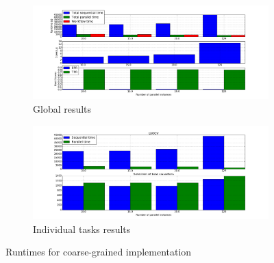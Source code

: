 \documentclass[10pt, conference, compsocconf]{IEEEtran}
\begin{document}
\begin{figure}[h]
  \begin{center}
    \begin{subfigure}{0.5\textwidth}
      \centering
      \includegraphics[width=\textwidth]{Figures/times_fixedparams_global_bars.png}
      \caption{\footnotesize Global results \label{subfig:coarse_glob}}
  \end{subfigure}
  \begin{subfigure}{0.5\textwidth}
    \centering
    \includegraphics[width=\textwidth]{Figures/times_fixedparams_individual_bars.png}
    \caption{\footnotesize Individual tasks results \label{subfig:coarse_ind}}
  \end{subfigure}
\end{center}
\caption{Runtimes for coarse-grained implementation \label{fig:coarse-grained}}
\end{figure}
\end{document}
